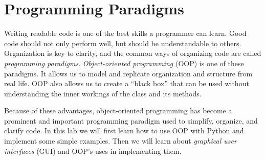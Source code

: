 \label{lab:OOP}

\section*{Programming Paradigms}

Writing readable code is one of the best skills a programmer can learn.
Good code should not only perform well, but should be understandable to others.
Organization is key to clarity, and the common ways of organizing code are called \emph{programming paradigms}.
\emph{Object-oriented programming} (OOP) is one of these paradigms.
It allows us to model and replicate organization and structure from real life.
OOP also allows us to create a ``black box'' that can be used without understanding the inner workings of the class and its methods.

Because of these advantages, object-oriented programming has become a prominent and important programming paradigm used to simplify, organize, and clarify code.
In this lab we will first learn how to use OOP with Python and implement some simple examples.
Then we will learn about \emph{graphical user interfaces} (GUI) and OOP's uses in implementing them.


\begin{comment}
A way of organizing a program is often called a ``paradigm."

Paradigms are designed to create better code by structuring or organizing the code in a more meaningful way.
Code without any structure is often referred to as ``spaghetti code.''
Spaghetti can be very easy to write, but very difficult to understand or modify.
\emph{Structured programming} emphasizes the use of programming structures to select or repeat the execution of blocks of code.
It is good practice to structure your programs in such a way that they are easy to understand, extend, or reuse.
Making extensive use of procedures (or subfunctions) is a characteristic of \emph{procedural programming}.
The work of the program is done in the subfunctions with one main function supervising the calling of each subfunction.

Another important, albeit specialized, paradigm is \li{object oriented programming} (or OOP).
The concept of object oriented programming is to model a problem as the interaction of a collection of objects.
There are many other paradigms such as declarative, event-driven, and array programming.
\end{comment}



